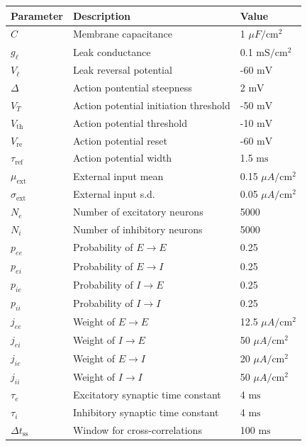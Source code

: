 \documentclass{ucetd}
\begin{document}
\clearpage
\begin{center}
    \begin{tabular}{ | p{4cm} p{7cm} p{4cm} |}
    \hline
    Parameter & Description & Value \\ \hline
    $C$ & Membrane capacitance & 1 $\mu F/\mathrm{cm}^{2}$ \\
    $g_{\ell}$ & Leak conductance & 0.1 $\mathrm{mS}/\mathrm{cm}^{2}$\\
    $V_{\ell}$ & Leak reversal potential & -60 $\mathrm{mV}$ \\
    $\Delta$ & Action pontential steepness & 2 $\mathrm{mV}$ \\
    $V_{T}$ & Action potential initiation threshold & -50 $\mathrm{mV}$ \\
    $V_{\mathrm{th}}$ & Action potential threshold & -10 $\mathrm{mV}$ \\
    $V_{\mathrm{re}}$ & Action potential reset & -60 $\mathrm{mV}$ \\
    $\tau_{\mathrm{ref}}$ & Action potential width & 1.5 $\mathrm{ms}$ \\
    $\mu_{\mathrm{ext}}$ & External input mean & 0.15 $\mu A/\mathrm{cm}^{2}$ \\
    $\sigma_{\mathrm{ext}}$ & External input s.d. & 0.05 $\mu A/\mathrm{cm}^{2}$ \\
    $N_{e}$ & Number of excitatory neurons & 5000 \\
    $N_{i}$ & Number of inhibitory neurons & 5000 \\
    $p_{ee}$ & Probability of $E\rightarrow E$ & 0.25 \\
    $p_{ei}$ & Probability of $E\rightarrow I$ & 0.25 \\
    $p_{ie}$ & Probability of $I\rightarrow E$ & 0.25 \\
    $p_{ii}$ & Probability of $I\rightarrow I$ & 0.25 \\
    $j_{ee}$ & Weight of $E\rightarrow E$ & 12.5 $\mu A/\mathrm{cm}^{2}$ \\
    $j_{ei}$ & Weight of $I\rightarrow E$ & 50 $\mu A/\mathrm{cm}^{2}$\\
    $j_{ie}$ & Weight of $E\rightarrow I$ & 20 $\mu A/\mathrm{cm}^{2}$ \\
    $j_{ii}$ & Weight of $I\rightarrow I$ & 50 $\mu A/\mathrm{cm}^{2}$\\
    $\tau_{e}$ & Excitatory synaptic time constant & 4 $\mathrm{ms}$\\
    $\tau_{i}$ & Inhibitory synaptic time constant & 4 $\mathrm{ms}$ \\
    $\Delta t_{\mathrm{ss}}$ & Window for cross-correlations & 100 $\mathrm{ms}$ \\
    \hline

    \end{tabular}
    
\end{center}
\end{document}
